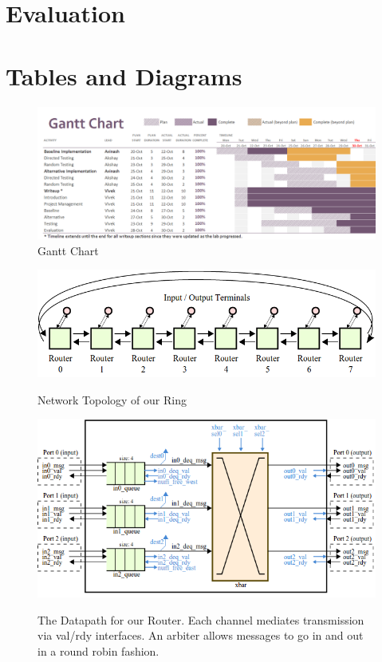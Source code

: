 \documentclass[10pt]{article}
\begin{document}
\section{Evaluation}

\newpage
\section {Tables and Diagrams}


\begin{figure}[h]
	\centering
	\includegraphics[scale=0.4, angle=90]{gantt}
	\caption{Gantt Chart}
	\label{fig:gantt}
\end{figure}

\begin{figure}[h]
	\centering
	\includegraphics[scale=0.5]{topology}
	\label{fig:topo}
	\caption{Network Topology of our Ring}
\end{figure}

\begin{figure}[h]
	\centering
	\includegraphics[scale=0.7]{dpath}
	\label{fig:dpath}
	\caption
	{
		The Datapath for our Router.
		Each channel mediates transmission via val/rdy interfaces.
		An arbiter allows messages to go in and out in a round robin fashion.
	}
\end{figure}
\end{document}
